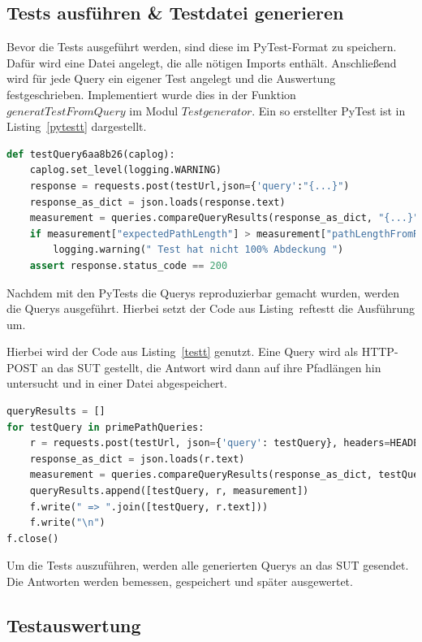\subsection{Tests ausführen \& Testdatei generieren}

Bevor die Tests ausgeführt werden, sind diese im PyTest-Format zu speichern.
Dafür wird eine Datei angelegt, die alle nötigen Imports enthält.
Anschließend wird für jede Query ein eigener Test angelegt und die Auswertung festgeschrieben.
Implementiert wurde dies in der Funktion $generatTestFromQuery$ im Modul $Testgenerator$.
Ein so erstellter PyTest ist in Listing~\ref{pytestt} dargestellt.

\begin{lstlisting}[language=Python, caption={PyTest einer Query}, label={pytestt}]
def testQuery6aa8b26(caplog):
    caplog.set_level(logging.WARNING)
    response = requests.post(testUrl,json={'query':"{...}")
    response_as_dict = json.loads(response.text)
    measurement = queries.compareQueryResults(response_as_dict, "{...}")
    if measurement["expectedPathLength"] > measurement["pathLengthFromResult"]:
        logging.warning(" Test hat nicht 100% Abdeckung ")
    assert response.status_code == 200
\end{lstlisting}

Nachdem mit den PyTests die Querys reproduzierbar gemacht wurden, werden die Querys ausgeführt.
Hierbei setzt der Code aus Listing~ref{testt} die Ausführung um.


Hierbei wird der Code aus Listing~\ref{testt} genutzt.
Eine Query wird als HTTP-POST an das SUT gestellt, die Antwort wird dann auf ihre Pfadlängen hin untersucht und in
einer Datei abgespeichert.

\begin{lstlisting}[language=Python, caption={Ausführen einer Testquery}, label={testt}]
queryResults = []
for testQuery in primePathQueries:
    r = requests.post(testUrl, json={'query': testQuery}, headers=HEADERS)
    response_as_dict = json.loads(r.text)
    measurement = queries.compareQueryResults(response_as_dict, testQuery)
    queryResults.append([testQuery, r, measurement])
    f.write(" => ".join([testQuery, r.text]))
    f.write("\n")
f.close()
\end{lstlisting}

Um die Tests auszuführen, werden alle generierten Querys an das SUT gesendet.
Die Antworten werden bemessen, gespeichert und später ausgewertet.

\subsection{Testauswertung}

